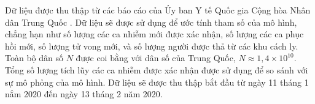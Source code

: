 \documentclass[../main.tex]{subfiles}
\begin{document}
\indent Dữ liệu được thu thập từ các báo cáo của Ủy ban Y tế Quốc gia Cộng hòa Nhân dân Trung Quốc \cite{NHCChina}. Dữ liệu sẽ được sử dụng để ước tính tham số của mô hình, chẳng hạn như số lượng các ca nhiễm mới được xác nhận, số lượng các ca phục hồi mới, số lượng tử vong mới, và số lượng người được thả từ các khu cách ly. Toàn bộ dân số $N$ được coi bằng với dân số của Trung Quốc, $N \approx 1,4\times 10^{10}$. Tổng số lượng tích lũy các ca nhiễm được xác nhận được sử dụng để so sánh với sự mô phỏng của mô hình. Dữ liệu sẽ được thu thập bắt đầu từ ngày 11 tháng 1 nắm 2020 đến ngày 13 tháng 2 năm 2020.
\end{document}
